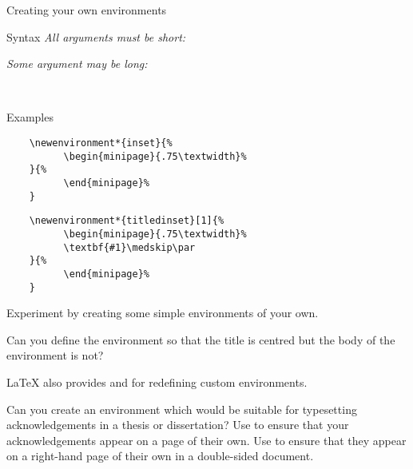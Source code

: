 
\begin{frame}{Creating your own environments}

  \begin{block}{Syntax}
	\emph{All arguments must be short:}\smallskip

    \alert<1>{}\alert<3>{}\alert<5>{}\alert<6>{}

    \alert<1>{}\alert<3>{}\alert<4>{}%
    \alert<5>{}\alert<6>{}\medskip

	\noindent\emph{Some argument may be long:}\smallskip

    \alert<2>{}\alert<3>{}\alert<5>{}\alert<6>{}

    \alert<2>{}\alert<3>{}\alert<4>{}%
      \alert<5>{}\alert<6>{}\\
  \end{block}

\end{frame}
\begin{frame}[fragile]

  \begin{block}{Examples}
	\begin{verbatim}
	\newenvironment*{inset}{%
		  \begin{minipage}{.75\textwidth}%
	}{%
		  \end{minipage}%
	}
	\end{verbatim}
	\begin{verbatim}
	\newenvironment*{titledinset}[1]{%
		  \begin{minipage}{.75\textwidth}%
		  \textbf{#1}\medskip\par
	}{%
		  \end{minipage}%
	}
	\end{verbatim}
  \end{block}

\end{frame}

\begin{exercise}
	Experiment by creating some simple environments of your own.

	Can you define the environment  so that the title is centred but the body of the environment is not?

	\LaTeX{} also provides  and  for redefining custom environments.

	Can you create an environment which would be suitable for typesetting acknowledgements in a thesis or dissertation?
	Use  to ensure that your acknowledgements appear on a page of their own.
	Use  to ensure that they appear on a right-hand page of their own in a double-sided document.
\end{exercise}

